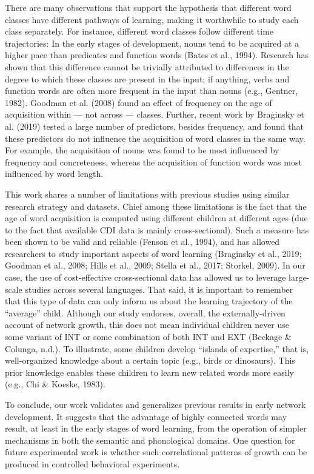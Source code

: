 \documentclass[english,,man,floatsintext]{apa6}
\begin{document}
There are many observations that support the hypothesis that different word classes have different pathways of learning, making it worthwhile to study each class separately. For instance, different word classes follow different time trajectories: In the early stages of development, nouns tend to be acquired at a higher pace than predicates and function words (Bates et al., 1994). Research has shown that this difference cannot be trivially attributed to differences in the degree to which these classes are present in the input; if anything, verbs and function words are often more frequent in the input than nouns (e.g., Gentner, 1982). Goodman et al. (2008) found an effect of frequency on the age of acquisition within --- not across --- classes. Further, recent work by Braginsky et al. (2019) tested a large number of predictors, besides frequency, and found that these predictors do not influence the acquisition of word classes in the same way. For example, the acquisition of nouns was found to be most influenced by frequency and concreteness, whereas the acquisition of function words was most influenced by word length.

This work shares a number of limitations with previous studies using similar research strategy and datasets. Chief among these limitations is the fact that the age of word acquisition is computed using different children at different ages (due to the fact that available CDI data is mainly cross-sectional). Such a measure has been shown to be valid and reliable (Fenson et al., 1994), and has allowed researchers to study important aspects of word learning (Braginsky et al., 2019; Goodman et al., 2008; Hills et al., 2009; Stella et al., 2017; Storkel, 2009). In our case, the use of cost-effective cross-sectional data has allowed us to leverage large-scale studies across several languages. That said, it is important to remember that this type of data can only inform us about the learning trajectory of the \enquote{average} child. Although our study endorses, overall, the externally-driven account of network growth, this does not mean individual children never use some variant of INT or some combination of both INT and EXT (Beckage \& Colunga, n.d.). To illustrate, some children develop \enquote{islands of expertise,} that is, well-organized knowledge about a certain topic (e.g., birds or dinosaurs). This prior knowledge enables these children to learn new related words more easily (e.g., Chi \& Koeske, 1983).

To conclude, our work validates and generalizes previous results in early network development. It suggests that the advantage of highly connected words may result, at least in the early stages of word learning, from the operation of simpler mechanisms in both the semantic and phonological domains. One question for future experimental work is whether such correlational patterns of growth can be produced in controlled behavioral experiments.
\end{document}
